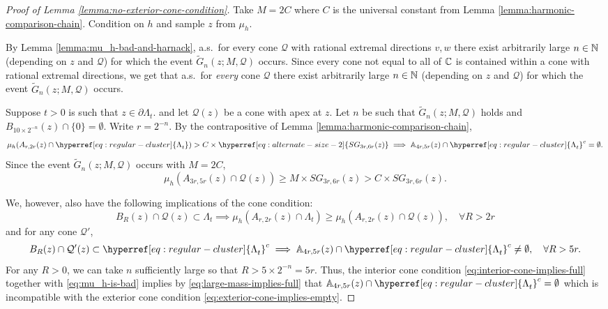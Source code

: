 \documentclass[12pt]{amsart}
\numberwithin{equation}{section}
\newcommand{\regcluster}[2]{\hyperref[eq:regular-cluster]{\Lambda^{#1}_{#2}}}
\newcommand{\SGrho}[2]{\hyperref[eq:alternate-size-2]{SG_{#1}(#2)}}
\begin{document}
	\begin{proof}[Proof of Lemma \ref{lemma:no-exterior-cone-condition}]
		Take $M = 2 C$ where $C$ is the universal constant from Lemma \ref{lemma:harmonic-comparison-chain}.
		Condition on $h$ and sample $z$ from $\mu_h$. 
		
		By Lemma \ref{lemma:mu_h-bad-and-harnack}, a.s.\ for every cone $\mathcal Q$ with rational extremal directions $v,w$ there exist arbitrarily large $n \in \mathbb{N}$  (depending on $z$ and $\mathcal Q$) for which the event $\tilde G_n(z; M, \mathcal{Q})$ occurs.  
		Since every cone not equal to all of $\mathbb{C}$ is contained within a cone with rational extremal directions, we get that a.s.\ for \emph{every} cone $\mathcal Q$ there exist arbitrarily large $n \in \mathbb{N}$  (depending on $z$ and $\mathcal Q$) for which the event $\tilde G_n(z; M, \mathcal{Q})$ occurs.  
		
		Suppose $t>0$ is such that $z \in \partial {\regcluster{}{t}}$.
		and let $\mathcal Q(z)$ be a cone with apex at $z$. Let $n$ be such that $\tilde G_n(z; M, \mathcal{Q})$ holds
		and $B_{10 \times 2^{-n} }(z) \cap \{0\} = \emptyset$. Write $r = 2^{-n}$. By the contrapositive of Lemma \ref{lemma:harmonic-comparison-chain}, 
		\begin{equation} \label{eq:large-mass-implies-full}
		\mu_h(A_{r, 2r}(z) \cap {\regcluster{}{t}}) > C \times \SGrho{3r,6r}{z} \implies \A_{4r, 5r}(z) \cap {{\regcluster{}{t}}}^c = \emptyset.
		\end{equation}
		Since the event $\tilde G_n(z; M, \mathcal{Q})$ occurs with $M = 2C$, 
		\begin{equation} \label{eq:mu_h-is-bad}
		\mu_h(A_{3r, 5r}(z) \cap \mathcal{Q}(z)) \geq M \times \SGrho{3r,6r}{z} >  C \times \SGrho{3r,6r}{z}.
		\end{equation}
		
		We, however, also have the following implications of the cone condition: 
		\begin{equation} \label{eq:interior-cone-implies-full}
		B_R(z) \cap \mathcal{Q}(z) \subset {\regcluster{}{t}}    \implies \mu_h(A_{r, 2r}(z) \cap {\regcluster{}{t}}) \geq 		\mu_h(A_{r, 2r}(z) \cap \mathcal{Q}(z)), \quad \forall R > 2 r
		\end{equation}
		and for any cone $\mathcal{Q}'$,
		\begin{equation} \label{eq:exterior-cone-implies-empty}
		B_R(z) \cap \mathcal{Q}'(z) \subset {{\regcluster{}{t}}}^c    \implies \A_{4 r, 5 r}(z) \cap {\regcluster{}{t}}^c \neq \emptyset, \quad \forall R > 5 r.
		\end{equation}
		For any $R > 0$, we can take $n$ sufficiently large so that $R > 5\times 2^{-n}=  5 r$. Thus, the  interior cone condition \eqref{eq:interior-cone-implies-full} together with \eqref{eq:mu_h-is-bad} implies by 
		\eqref{eq:large-mass-implies-full} that  $\A_{4r, 5r}(z) \cap {{\regcluster{}{t}}}^c = \emptyset$ which is incompatible
		with the exterior cone condition \eqref{eq:exterior-cone-implies-empty}.
	\end{proof}
	
\end{document}

